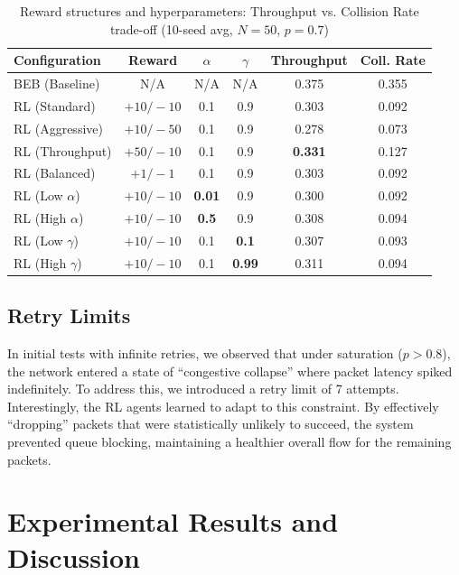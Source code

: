 \documentclass[12pt,a4paper,oneside]{article}
\theoremstyle{definition}
\begin{document}
\begin{table}[H]
    \centering
    \begin{tabular}{|l|c|c|c|c|c|}
        \hline
        \textbf{Configuration} & \textbf{Reward} & \textbf{$\alpha$} & \textbf{$\gamma$} & \textbf{Throughput} & \textbf{Coll. Rate} \\
        \hline
        BEB (Baseline) & N/A & N/A & N/A & 0.375 & 0.355 \\
        \hline
        RL (Standard) & $+10 / -10$ & 0.1 & 0.9 & 0.303 & 0.092 \\
        RL (Aggressive) & $+10 / -50$ & 0.1 & 0.9 & 0.278 & 0.073 \\
        RL (Throughput) & $+50 / -10$ & 0.1 & 0.9 & \textbf{0.331} & 0.127 \\
        RL (Balanced) & $+1 / -1$ & 0.1 & 0.9 & 0.303 & 0.092 \\
        \hline
        RL (Low $\alpha$) & $+10 / -10$ & \textbf{0.01} & 0.9 & 0.300 & 0.092 \\
        RL (High $\alpha$) & $+10 / -10$ & \textbf{0.5} & 0.9 & 0.308 & 0.094 \\
        \hline
        RL (Low $\gamma$) & $+10 / -10$ & 0.1 & \textbf{0.1} & 0.307 & 0.093 \\
        RL (High $\gamma$) & $+10 / -10$ & 0.1 & \textbf{0.99} & 0.311 & 0.094 \\
        \hline
    \end{tabular}
    \caption{Reward structures and hyperparameters: Throughput vs. Collision Rate trade-off (10-seed avg, $N=50$, $p=0.7$)}
    \label{tab:parameter_comparison}
\end{table}

\subsection{Retry Limits}
In initial tests with infinite retries, we observed that under saturation ($p > 0.8$), the network entered a state of ``congestive collapse'' where packet latency spiked indefinitely. To address this, we introduced a retry limit of 7 attempts. Interestingly, the RL agents learned to adapt to this constraint. By effectively ``dropping'' packets that were statistically unlikely to succeed, the system prevented queue blocking, maintaining a healthier overall flow for the remaining packets.

\section{Experimental Results and Discussion}
\end{document}
